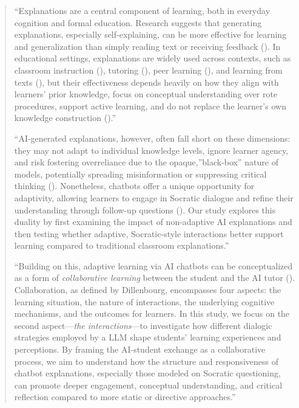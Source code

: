 \documentclass[
  11pt,
]{article}
\begin{document}
\begin{quote}
``Explanations are a central component of learning, both in everyday cognition and formal education. Research suggests that generating explanations, especially self-explaining, can be more effective for learning and generalization than simply reading text or receiving feedback (). In educational settings, explanations are widely used across contexts, such as classroom instruction (), tutoring (), peer learning (), and learning from texts (), but their effectiveness depends heavily on how they align with learners' prior knowledge, focus on conceptual understanding over rote procedures, support active learning, and do not replace the learner's own knowledge construction ().''

``AI-generated explanations, however, often fall short on these dimensions: they may not adapt to individual knowledge levels, ignore learner agency, and risk fostering overreliance due to the opaque,''black-box'' nature of models, potentially spreading misinformation or suppressing critical thinking (). Nonetheless, chatbots offer a unique opportunity for adaptivity, allowing learners to engage in Socratic dialogue and refine their understanding through follow-up questions (). Our study explores this duality by first examining the impact of non-adaptive AI explanations and then testing whether adaptive, Socratic-style interactions better support learning compared to traditional classroom explanations.''

``Building on this, adaptive learning via AI chatbots can be conceptualized as a form of \emph{collaborative learning} between the student and the AI tutor (). Collaboration, as defined by Dillenbourg, encompasses four aspects: the learning situation, the nature of interactions, the underlying cognitive mechanisms, and the outcomes for learners. In this study, we focus on the second aspect---\emph{the interactions}---to investigate how different dialogic strategies employed by a LLM shape students' learning experiences and perceptions. By framing the AI-student exchange as a collaborative process, we aim to understand how the structure and responsiveness of chatbot explanations, especially those modeled on Socratic questioning, can promote deeper engagement, conceptual understanding, and critical reflection compared to more static or directive approaches.''
\end{quote}
\end{document}
